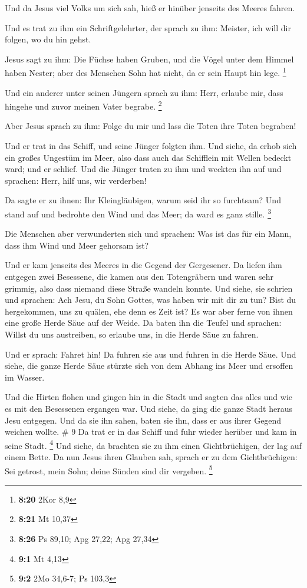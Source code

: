  Und da Jesus viel Volks um sich sah, hieß er hinüber
jenseits des Meeres fahren.

 Und es trat zu ihm ein Schriftgelehrter, der sprach zu
ihm: Meister, ich will dir folgen, wo du hin gehst.

 Jesus sagt zu ihm: Die Füchse haben Gruben, und die Vögel
unter dem Himmel haben Nester; aber des Menschen Sohn hat nicht, da er
sein Haupt hin lege. \footnote{\textbf{8:20} 2Kor 8,9}

 Und ein anderer unter seinen Jüngern sprach zu ihm: Herr,
erlaube mir, dass hingehe und zuvor meinen Vater begrabe. \footnote{\textbf{8:21}
  Mt 10,37}

 Aber Jesus sprach zu ihm: Folge du mir und lass die Toten
ihre Toten begraben!

 Und er trat in das Schiff, und seine Jünger folgten ihm.
 Und siehe, da erhob sich ein großes Ungestüm im Meer, also
dass auch das Schifflein mit Wellen bedeckt ward; und er schlief.
 Und die Jünger traten zu ihm und weckten ihn auf und
sprachen: Herr, hilf uns, wir verderben!

 Da sagte er zu ihnen: Ihr Kleingläubigen, warum seid ihr
so furchtsam? Und stand auf und bedrohte den Wind und das Meer; da ward
es ganz stille. \footnote{\textbf{8:26} Ps 89,10; Apg 27,22; Apg 27,34}

 Die Menschen aber verwunderten sich und sprachen: Was ist
das für ein Mann, dass ihm Wind und Meer gehorsam ist?

 Und er kam jenseits des Meeres in die Gegend der
Gergesener. Da liefen ihm entgegen zwei Besessene, die kamen aus den
Totengräbern und waren sehr grimmig, also dass niemand diese Straße
wandeln konnte.  Und siehe, sie schrien und sprachen: Ach
Jesu, du Sohn Gottes, was haben wir mit dir zu tun? Bist du hergekommen,
uns zu quälen, ehe denn es Zeit ist?  Es war aber ferne von
ihnen eine große Herde Säue auf der Weide.  Da baten ihn
die Teufel und sprachen: Willst du uns austreiben, so erlaube uns, in
die Herde Säue zu fahren.

 Und er sprach: Fahret hin! Da fuhren sie aus und fuhren in
die Herde Säue. Und siehe, die ganze Herde Säue stürzte sich von dem
Abhang ins Meer und ersoffen im Wasser.

 Und die Hirten flohen und gingen hin in die Stadt und
sagten das alles und wie es mit den Besessenen ergangen war.
 Und siehe, da ging die ganze Stadt heraus Jesu entgegen.
Und da sie ihn sahen, baten sie ihn, dass er aus ihrer Gegend weichen
wollte. \# 9  Da trat er in das Schiff und fuhr wieder
herüber und kam in seine Stadt. \footnote{\textbf{9:1} Mt 4,13}
 Und siehe, da brachten sie zu ihm einen Gichtbrüchigen, der
lag auf einem Bette. Da nun Jesus ihren Glauben sah, sprach er zu dem
Gichtbrüchigen: Sei getrost, mein Sohn; deine Sünden sind dir vergeben.
\footnote{\textbf{9:2} 2Mo 34,6-7; Ps 103,3}

